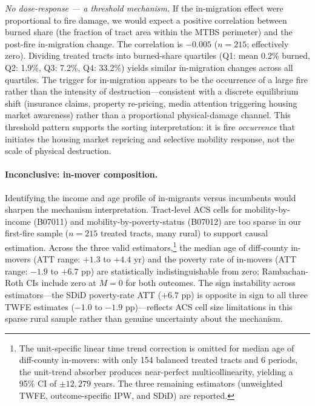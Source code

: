 \documentclass[12pt]{article}
\begin{document}
\emph{No dose-response --- a threshold mechanism.}
If the in-migration effect were proportional to fire damage,
we would expect a positive correlation between burned share (the
fraction of tract area within the MTBS perimeter) and the
post-fire in-migration change.
The correlation is $-0.005$ ($n = 215$; effectively zero).
Dividing treated tracts into burned-share quartiles
(Q1: mean 0.2\% burned, Q2: 1.9\%, Q3: 7.2\%, Q4: 33.2\%) yields
similar in-migration changes across all quartiles.
The trigger for in-migration appears to be the occurrence of a large fire
rather than the intensity of destruction---consistent with a discrete
equilibrium shift (insurance claims, property re-pricing,
media attention triggering housing market awareness) rather than a
proportional physical-damage channel.
This threshold pattern supports the sorting interpretation: it is fire
\emph{occurrence} that initiates the housing market repricing and
selective mobility response, not the scale of physical destruction.

\paragraph{Inconclusive: in-mover composition.}
Identifying the income and age profile of in-migrants versus incumbents
would sharpen the mechanism interpretation.
Tract-level ACS cells for mobility-by-income (B07011) and
mobility-by-poverty-status (B07012) are too sparse in our first-fire
sample ($n = 215$ treated tracts, many rural) to support causal estimation.
Across the three valid estimators,\footnote{%
  The unit-specific linear time trend correction is omitted for
  median age of diff-county in-movers: with only 154 balanced treated
  tracts and 6 periods, the unit-trend absorber produces near-perfect
  multicollinearity, yielding a 95\% CI of $\pm 12{,}279$ years.
  The three remaining estimators (unweighted TWFE, outcome-specific IPW,
  and SDiD) are reported.}
the median age of diff-county in-movers
(ATT range: $+1.3$ to $+4.4$ yr) and the poverty rate of in-movers
(ATT range: $-1.9$ to $+6.7$ pp) are statistically indistinguishable
from zero; Rambachan-Roth CIs include zero at $M = 0$ for both outcomes.
The sign instability across estimators---the SDiD poverty-rate ATT
($+6.7$ pp) is opposite in sign to all three TWFE estimates
($-1.0$ to $-1.9$ pp)---reflects ACS cell size limitations
in this sparse rural sample rather than genuine uncertainty about the mechanism.
\end{document}
